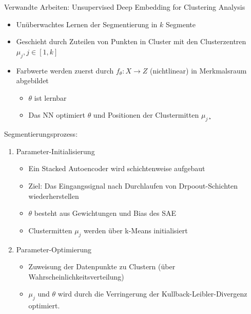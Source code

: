 \documentclass{beamer}
\begin{document}
\begin{frame}[allowframebreaks]{Verwandte Arbeiten: Unsupervised Deep Embedding for Clustering Analysis \cite{junyuan_16}}
\begin{itemize}
	\item Unüberwachtes Lernen der Segmentierung in $k$ Segmente
	\item Geschieht durch Zuteilen von Punkten in Cluster mit den Clusterzentren $\mu_j, j\in \left[1, k\right]$
	\item Farbwerte werden zuerst durch $f_\theta:X\rightarrow Z$ (nichtlinear) in Merkmalsraum abgebildet
	\begin{itemize}
		\item $\theta$ ist lernbar
		\item Das NN optimiert $\theta$ und Positionen der Clustermitten $\mu_j$¸
	\end{itemize}
\end{itemize}
\newpage
Segmentierungsprozess:
\begin{enumerate}
	\item Parameter-Initialisierung
	\begin{itemize}
		\item Ein Stacked Autoencoder wird schichtenweise aufgebaut
		\item Ziel: Das Eingangssignal nach Durchlaufen von Drpoout-Schichten wiederherstellen
		\item $\theta$ besteht aus Gewichtungen und Bias des SAE
		\item Clustermitten $\mu_j$ werden über k-Means initialisiert
	\end{itemize}
\item Parameter-Optimierung
\begin{itemize}
	\item Zuweisung der Datenpunkte zu Clustern (über Wahrscheinlichkeitsverteilung)
	\item $\mu_j$ und $\theta$ wird durch die Verringerung der Kullback-Leibler-Divergenz optimiert.
\end{itemize}
\end{enumerate}
\end{frame}
\end{document}
